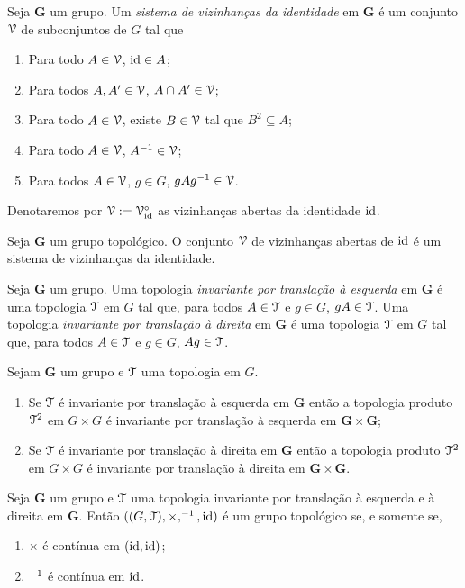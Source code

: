 \begin{defi}
Seja $\bm G$ um grupo. Um \emph{sistema de vizinhanças da identidade} em $\bm G$ é um conjunto $\mathcal{V}$ de subconjuntos de $G$ tal que
	\begin{enumerate}
	\item Para todo $A \in \mathcal{V}$, $\mathrm{id} \in A$;
	\item Para todos $A,A' \in \mathcal{V}$, $A \cap A' \in \mathcal{V}$;
	\item Para todo $A \in \mathcal{V}$, existe $B \in \mathcal{V}$ tal que $B^2 \subseteq A$;
	\item	 Para todo $A \in \mathcal{V}$, $A^{-1} \in \mathcal{V}$;
	\item Para todos $A \in \mathcal{V}$, $g \in G$, $gAg^{-1} \in \mathcal{V}$.	
	\end{enumerate}
\end{defi}

Denotaremos por $\mathcal{V} := \mathcal{V}_{\mathrm{id}}^\circ$ as vizinhanças abertas da identidade $\mathrm{id}$.

\begin{prop}
Seja $\bm G$ um grupo topológico. O conjunto $\mathcal{V}$ de vizinhanças abertas de $\mathrm{id}$ é um sistema de vizinhanças da identidade.
\end{prop}

\begin{defi}
Seja $\bm G$ um grupo. Uma topologia \emph{invariante por translação à esquerda} em $\bm G$ é uma topologia $\mathcal{T}$ em $G$ tal que, para todos $A \in \mathcal{T}$ e $g \in G$, $gA \in \mathcal{T}$. Uma topologia \emph{invariante por translação à direita} em $\bm G$ é uma topologia $\mathcal{T}$ em $G$ tal que, para todos $A \in \mathcal{T}$ e $g \in G$, $Ag \in \mathcal{T}$.
\end{defi}

\begin{prop}
Sejam $\bm G$ um grupo e $\mathcal{T}$ uma topologia em $G$.
	\begin{enumerate}
	\item Se $\mathcal{T}$ é invariante por translação à esquerda em $\bm G$ então a topologia produto $\mathcal{T}^2$ em $G \times G$ é invariante por translação à esquerda em $\bm G \times \bm G$;
	\item Se $\mathcal{T}$ é invariante por translação à direita em $\bm G$ então a topologia produto $\mathcal{T}^2$ em $G \times G$ é invariante por translação à direita em $\bm G \times \bm G$.
	\end{enumerate}
\end{prop}

\begin{prop}
Seja $\bm G$ um grupo e $\mathcal{T}$ uma topologia invariante por translação à esquerda e à direita em $\bm G$. Então $((G,\mathcal{T}),\times,^{-1},\mathrm{id})$ é um grupo topológico se, e somente se,
	\begin{enumerate}
	\item $\times$ é contínua em $(\mathrm{id},\mathrm{id})$;
	\item $^{-1}$ é contínua em $\mathrm{id}$.
	\end{enumerate}
\end{prop}

